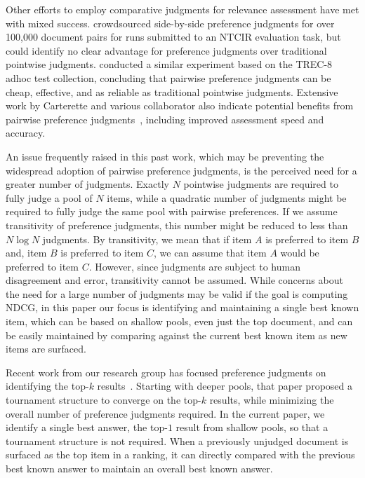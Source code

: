 \documentclass[fullpage]{article}
\begin{document}
Other efforts to employ comparative judgments for relevance assessment have met with mixed success. \citet{sz20} crowdsourced side-by-side preference judgments for over 100,000 document pairs for runs submitted to an NTCIR evaluation task, but could identify no clear advantage for preference judgments over traditional pointwise judgments. \citet{ymt18} conducted a similar experiment based on the TREC-8 adhoc test collection, concluding that pairwise preference judgments can be cheap, effective, and as reliable as traditional pointwise judgments. Extensive work by Carterette and various collaborator also indicate potential benefits from pairwise preference judgments~\cite{cbcd08,zc10,cp08,cbc08}, including improved assessment speed and accuracy.

An issue frequently raised in this past work, which may be preventing the widespread adoption of pairwise preference judgments, is the perceived need for a greater number of judgments. Exactly $N$ pointwise judgments are required to fully judge a pool of $N$ items, while a quadratic number of judgments might be required to fully judge the same pool with pairwise preferences. If we assume transitivity of preference judgments,  this number might be reduced to less than $N\log N$ judgments. By transitivity,  we mean that if item $A$ is preferred to item $B$ and, item $B$ is preferred to item $C$, we can assume that item $A$ would be preferred to item $C$. However, since judgments are subject to human disagreement and error, transitivity cannot be assumed. While concerns about the need for a large number of judgments may be valid if the goal is computing NDCG, in this paper our focus is identifying and maintaining a single best known item, which can be based on shallow pools, even just the top document, and can be easily maintained by comparing against the current best known item as new items are surfaced.

Recent work from our research group has focused preference judgments on identifying the top-$k$ results~\cite{clarke2020assessing}.
Starting with deeper pools,
that paper proposed a tournament structure to converge on the top-$k$ results,
while minimizing the overall number of preference judgments required.
In the current paper, we identify a single best answer, the top-$1$ result from
shallow pools, so that a tournament structure is not required.
When a previously unjudged document is surfaced as the top item in a ranking,
it can directly compared with the previous best known answer to maintain an overall
best known answer.
\end{document}
